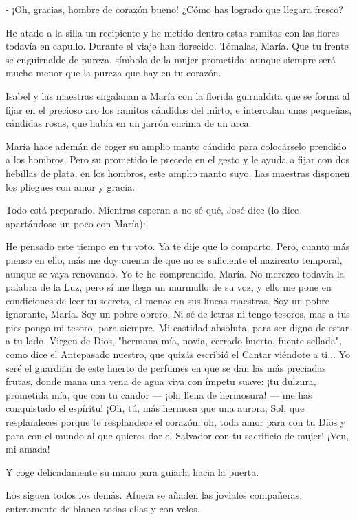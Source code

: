 \documentclass[12pt]{book} %
\begin{document}
- ¡Oh, gracias, hombre de corazón bueno! ¿Cómo has logrado que llegara fresco? 

He atado a la silla un recipiente y he metido dentro estas ramitas con las flores todavía en capullo. Durante el viaje han florecido. Tómalas, María. Que tu frente se enguirnalde de pureza, símbolo de la mujer prometida; aunque siempre será mucho menor que la pureza que hay en tu corazón. 

Isabel y las maestras engalanan a María con la florida guirnaldita que se forma al fijar en el precioso aro los ramitos cándidos del mirto, e intercalan unas pequeñas, cándidas rosas, que había en un jarrón encima de un arca. 

María hace ademán de coger su amplio manto cándido para colocárselo prendido a los hombros. Pero su prometido le precede en el gesto y le ayuda a fijar con dos hebillas de plata, en los hombros, este amplio manto suyo. Las maestras disponen los pliegues con amor y gracia. 

Todo está preparado. Mientras esperan a no sé qué, José dice (lo dice apartándose un poco con María): 

He pensado este tiempo en tu voto. Ya te dije que lo comparto. Pero, cuanto más pienso en ello, más me doy cuenta de que no es suficiente el nazireato temporal, aunque se vaya renovando. Yo te he comprendido, María. No merezco todavía la palabra de la Luz, pero sí me llega un murmullo de su voz, y ello me pone en condiciones de leer tu secreto, al menos en sus líneas maestras. Soy un pobre ignorante, María. Soy un pobre obrero. Ni sé de letras ni tengo tesoros, mas a tus pies pongo mi tesoro, para siempre. Mi castidad absoluta, para ser digno de estar a tu lado, Virgen de Dios, "hermana mía, novia, cerrado huerto, fuente sellada", como dice el Antepasado nuestro, que quizás escribió el Cantar viéndote a ti... Yo seré el guardián de este huerto de perfumes en que se dan las más preciadas frutas, donde mana una vena de agua viva con ímpetu suave: ¡tu dulzura, prometida mía, que con tu candor — ¡oh, llena de hermosura! — me has conquistado el espíritu! ¡Oh, tú, más hermosa que una aurora; Sol, que resplandeces porque te resplandece el corazón; oh, toda amor para con tu Dios y para con el mundo al que quieres dar el Salvador con tu sacrificio de mujer! ¡Ven, mi amada! 

Y coge delicadamente su mano para guiarla hacia la puerta. 

Los siguen todos los demás. Afuera se añaden las joviales compañeras, enteramente de blanco todas ellas y con velos. 
\end{document}
